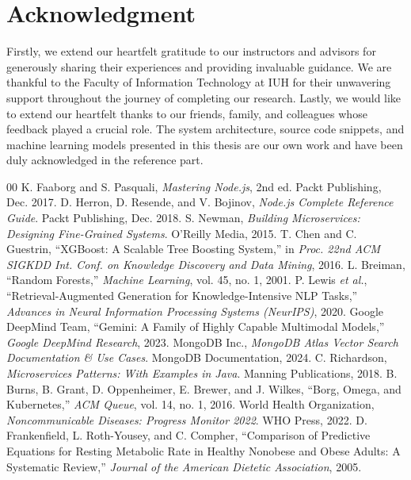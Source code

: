 \documentclass[journal, a4paper]{IEEEtran}
\begin{document}
\appendices
\section*{Acknowledgment}

Firstly, we extend our heartfelt gratitude to our instructors and advisors for generously sharing their experiences and providing invaluable guidance. We are thankful to the Faculty of Information Technology at IUH for their unwavering support throughout the journey of completing our research. Lastly, we would like to extend our heartfelt thanks to our friends, family, and colleagues whose feedback played a crucial role. The system architecture, source code snippets, and machine learning models presented in this thesis are our own work and have been duly acknowledged in the reference part.
\renewcommand{\refname}{REFERENCES}
\begin{thebibliography}{00}
 K. Faaborg and S. Pasquali, \textit{Mastering Node.js}, 2nd ed. Packt Publishing, Dec. 2017.
 D. Herron, D. Resende, and V. Bojinov, \textit{Node.js Complete Reference Guide}. Packt Publishing, Dec. 2018.
 S. Newman, \textit{Building Microservices: Designing Fine-Grained Systems}. O'Reilly Media, 2015.
 T. Chen and C. Guestrin, ``XGBoost: A Scalable Tree Boosting System,'' in \textit{Proc. 22nd ACM SIGKDD Int. Conf. on Knowledge Discovery and Data Mining}, 2016.
 L. Breiman, ``Random Forests,'' \textit{Machine Learning}, vol. 45, no. 1, 2001.
 P. Lewis \textit{et al.}, ``Retrieval-Augmented Generation for Knowledge-Intensive NLP Tasks,'' \textit{Advances in Neural Information Processing Systems (NeurIPS)}, 2020.
 Google DeepMind Team, ``Gemini: A Family of Highly Capable Multimodal Models,'' \textit{Google DeepMind Research}, 2023.
 MongoDB Inc., \textit{MongoDB Atlas Vector Search Documentation \& Use Cases}. MongoDB Documentation, 2024.
 C. Richardson, \textit{Microservices Patterns: With Examples in Java}. Manning Publications, 2018.
 B. Burns, B. Grant, D. Oppenheimer, E. Brewer, and J. Wilkes, ``Borg, Omega, and Kubernetes,'' \textit{ACM Queue}, vol. 14, no. 1, 2016.
 World Health Organization, \textit{Noncommunicable Diseases: Progress Monitor 2022}. WHO Press, 2022.
 D. Frankenfield, L. Roth-Yousey, and C. Compher, ``Comparison of Predictive Equations for Resting Metabolic Rate in Healthy Nonobese and Obese Adults: A Systematic Review,'' \textit{Journal of the American Dietetic Association}, 2005.
\end{thebibliography}
\end{document}

